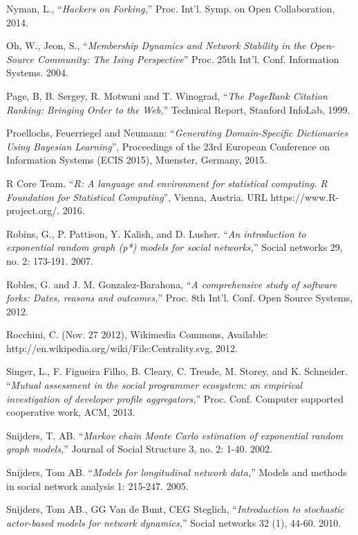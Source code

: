 \begin{thebibliography}{99.}
 Nyman, L., ``\textit{Hackers on Forking,}'' Proc. Int'l. Symp. on Open Collaboration, 2014. 

 Oh, W., Jeon, S., ``\textit{Membership Dynamics and Network Stability in the Open-Source Community: The Ising Perspective}'' Proc. 25th Int'l. Conf. Information Systems. 2004.

 Page, B, B. Sergey, R. Motwani and T. Winograd, ``\textit{The PageRank Citation Ranking: Bringing Order to the Web,}'' Technical Report, Stanford InfoLab, 1999.

 Proellochs, Feuerriegel and Neumann: ``\textit{Generating Domain-Specific Dictionaries Using Bayesian Learning}'', Proceedings of the 23rd European Conference on Information Systems (ECIS 2015), Muenster, Germany, 2015.

 R Core Team. ``\textit{R: A language and environment for statistical computing. R Foundation for Statistical Computing}'', Vienna, Austria. URL https://www.R-project.org/. 2016.

 Robins, G., P. Pattison, Y. Kalish, and D. Lusher. ``\textit{An introduction to exponential random graph (p*) models for social networks,}'' Social networks 29, no. 2: 173-191. 2007.

 Robles, G. and J. M. Gonzalez-Barahona, ``\textit{A comprehensive study of software forks: Dates, reasons and outcomes,}'' Proc. 8th Int'l. Conf. Open Source Systems, 2012. 

 Rocchini, C. (Nov. 27 2012), Wikimedia Commons, Available:\\ http://en.wikipedia.org/wiki/File:Centrality.svg, 2012.  

 Singer, L., F. Figueira Filho, B. Cleary, C. Treude, M. Storey, and K. Schneider. ``\textit{Mutual assessment in the social programmer ecosystem: an empirical investigation of developer profile aggregators,}'' Proc. Conf. Computer supported cooperative work, ACM, 2013.

 Snijders, T. AB. ``\textit{Markov chain Monte Carlo estimation of exponential random graph models,}'' Journal of Social Structure 3, no. 2: 1-40. 2002.

 Snijders, Tom AB. ``\textit{Models for longitudinal network data,}'' Models and methods in social network analysis 1: 215-247. 2005.

 Snijders, Tom AB., GG Van de Bunt, CEG Steglich, ``\textit{Introduction to stochastic actor-based models for network dynamics,}'' Social networks 32 (1), 44-60. 2010.


\end{thebibliography}
